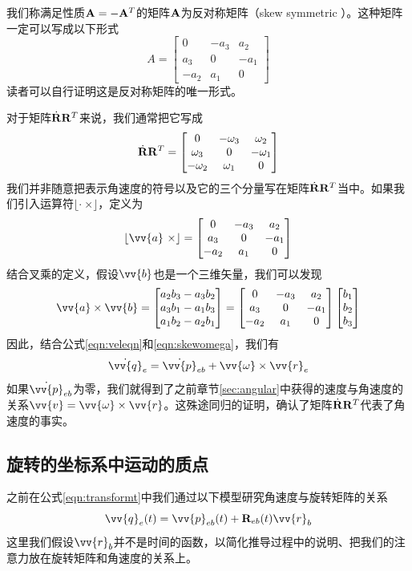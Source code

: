 \documentclass[11pt]{article}
\begin{document}
我们称满足性质${\bf A} = -{\bf A}^T  $的矩阵${\bf A}$为反对称矩阵（skew symmetric ）。这种矩阵一定可以写成以下形式
$$
A = \begin{bmatrix}
0 & -a_3 & a_2\\
a_3 & 0 & - a_1\\
-a_2 & a_1 & 0
\end{bmatrix}
$$
读者可以自行证明这是反对称矩阵的唯一形式。

对于矩阵$\dot{{\bf R}}{\bf R}^T$来说，我们通常把它写成
\begin{equation}\label{eqn:skewomega}
\dot{{\bf R}}{\bf R}^T = \begin{bmatrix}
0 & -\omega_3 & \omega_2\\
\omega_3 & 0 & - \omega_1\\
-\omega_2 & \omega_1 & 0
\end{bmatrix}
\end{equation}
我们并非随意把表示角速度的符号以及它的三个分量写在矩阵$\dot{{\bf R}}{\bf R}^T$当中。如果我们引入运算符$\lfloor \cdot \ \times \rfloor$，定义为
$$
\lfloor \vv{a} \ \times \rfloor =  \begin{bmatrix}
0 & -a_3 & a_2\\
a_3 & 0 & - a_1\\
-a_2 & a_1 & 0
\end{bmatrix}
$$
结合叉乘的定义，假设$\vv{b}$也是一个三维矢量，我们可以发现
$$
\vv{a} \times \vv{b} = 
\begin{bmatrix}
a_2b_3-a_3b_2\\
a_3b_1-a_1b_3\\
a_1b_2-a_2b_1
\end{bmatrix} =
\begin{bmatrix}
0 & -a_3 & a_2\\
a_3 & 0 & - a_1\\
-a_2 & a_1 & 0
\end{bmatrix}
\begin{bmatrix}
b_1\\
b_2\\
b_3
\end{bmatrix}
$$
因此，结合公式\ref{eqn:veleqn}和\ref{eqn:skewomega}，我们有
$$
\dot{\vv{q}}_{e}  = \dot{ \vv{p}}_{eb} + \vv{\omega} \times \vv{r}_e
$$
如果$\dot{ \vv{p}}_{eb}$为零，我们就得到了之前章节\ref{sec:angular}中获得的速度与角速度的关系$\vv{v} = \vv{\omega} \times \vv{r}$。这殊途同归的证明，确认了矩阵$\dot{{\bf R}}{\bf R}^T$代表了角速度的事实。

\subsection{旋转的坐标系中运动的质点}\label{sec:movingcor}
之前在公式\ref{eqn:transformt}中我们通过以下模型研究角速度与旋转矩阵的关系
$$
\vv{q}_{e}(t) = \vv{p}_{eb}(t) + {\bf R}_{eb}(t)\vv{r}_b
$$
这里我们假设$\vv{r}_b$并不是时间的函数，以简化推导过程中的说明、把我们的注意力放在旋转矩阵和角速度的关系上。
\end{document}
